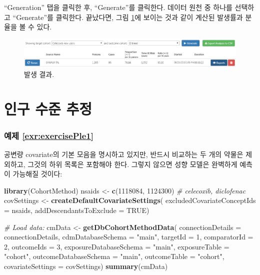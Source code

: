\documentclass[10.5pt]{book}
\newenvironment{Shaded}{\begin{snugshade}}{\end{snugshade}}
\newcommand{\KeywordTok}[1]{\textcolor[rgb]{0.13,0.29,0.53}{\textbf{#1}}}
\newcommand{\DataTypeTok}[1]{\textcolor[rgb]{0.13,0.29,0.53}{#1}}
\newcommand{\DecValTok}[1]{\textcolor[rgb]{0.00,0.00,0.81}{#1}}
\newcommand{\StringTok}[1]{\textcolor[rgb]{0.31,0.60,0.02}{#1}}
\newcommand{\CommentTok}[1]{\textcolor[rgb]{0.56,0.35,0.01}{\textit{#1}}}
\newcommand{\OtherTok}[1]{\textcolor[rgb]{0.56,0.35,0.01}{#1}}
\newcommand{\NormalTok}[1]{#1}
\theoremstyle{definition}
\theoremstyle{definition}
\theoremstyle{definition}
\theoremstyle{remark}
\begin{document}
``Generation'' 탭을 클릭한 후, ``Generate''를 클릭한다. 데이터 원천 중
하나를 선택하고 ``Generate''를 클릭한다. 끝났다면, 그림
\ref{fig:irResults}에 보이는 것과 같이 계산된 발생률과 분율을 볼 수
있다.

\begin{figure}

{\centering \includegraphics[width=1\linewidth]{images/SuggestedAnswers/irResults} 

}

\caption{발생 결과.}\label{fig:irResults}
\end{figure}

\section{인구 수준 추정}\label{Pleanswers}

\subsubsection*{예제 \ref{exr:exercisePle1}}\label{-refexrexerciseple1}

공변량 covariate의 기본 모음을 명시하고 있지만, 반드시 비교하는 두 개의
약물은 제외하고, 그것의 하위 목록은 포함해야 한다. 그렇지 않으면 성향
모델은 완벽하게 예측이 가능해질 것이다:

\begin{Shaded}
\begin{Highlighting}[]
\KeywordTok{library}\NormalTok{(CohortMethod)}
\NormalTok{nsaids <-}\StringTok{ }\KeywordTok{c}\NormalTok{(}\DecValTok{1118084}\NormalTok{, }\DecValTok{1124300}\NormalTok{) }\CommentTok{# celecoxib, diclofenac}
\NormalTok{covSettings <-}\StringTok{ }\KeywordTok{createDefaultCovariateSettings}\NormalTok{(}
  \DataTypeTok{excludedCovariateConceptIds =}\NormalTok{ nsaids,}
  \DataTypeTok{addDescendantsToExclude =} \OtherTok{TRUE}\NormalTok{)}

\CommentTok{# Load data:}
\NormalTok{cmData <-}\StringTok{ }\KeywordTok{getDbCohortMethodData}\NormalTok{(}
  \DataTypeTok{connectionDetails =}\NormalTok{ connectionDetails,}
  \DataTypeTok{cdmDatabaseSchema =} \StringTok{"main"}\NormalTok{,}
  \DataTypeTok{targetId =} \DecValTok{1}\NormalTok{,}
  \DataTypeTok{comparatorId =} \DecValTok{2}\NormalTok{,}
  \DataTypeTok{outcomeIds =} \DecValTok{3}\NormalTok{,}
  \DataTypeTok{exposureDatabaseSchema =} \StringTok{"main"}\NormalTok{,}
  \DataTypeTok{exposureTable =} \StringTok{"cohort"}\NormalTok{,}
  \DataTypeTok{outcomeDatabaseSchema =} \StringTok{"main"}\NormalTok{,}
  \DataTypeTok{outcomeTable =} \StringTok{"cohort"}\NormalTok{,}
  \DataTypeTok{covariateSettings =}\NormalTok{ covSettings)}
\KeywordTok{summary}\NormalTok{(cmData)}
\end{Highlighting}
\end{Shaded}
\end{document}
